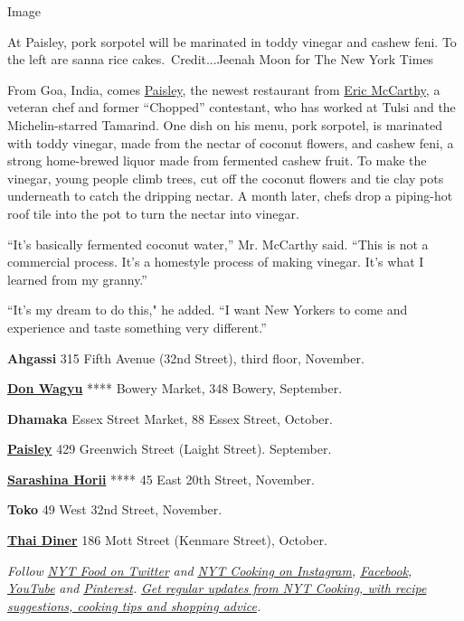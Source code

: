 Image

At Paisley, pork sorpotel will be marinated in toddy vinegar and cashew
feni. To the left are sanna rice cakes.~Credit...Jeenah Moon for The New
York Times

From Goa, India, comes
\href{http://www.paisleyrestaurantnyc.com/}{Paisley}, the newest
restaurant from
\href{https://www.nytimes3xbfgragh.onion/2002/07/31/dining/25-and-under-a-spicy-indian-spot-that-doesn-t-care-to-fit-in.html}{Eric
McCarthy}, a veteran chef and former ``Chopped'' contestant, who has
worked at Tulsi and the Michelin-starred Tamarind. One dish on his menu,
pork sorpotel, is marinated with toddy vinegar, made from the nectar of
coconut flowers, and cashew feni, a strong home-brewed liquor made from
fermented cashew fruit. To make the vinegar, young people climb trees,
cut off the coconut flowers and tie clay pots underneath to catch the
dripping nectar. A month later, chefs drop a piping-hot roof tile into
the pot to turn the nectar into vinegar.

``It's basically fermented coconut water,'' Mr. McCarthy said. ``This is
not a commercial process. It's a homestyle process of making vinegar.
It's what I learned from my granny.''

``It's my dream to do this," he added. ``I want New Yorkers to come and
experience and taste something very different.''

\textbf{Ahgassi} 315 Fifth Avenue (32nd Street), third floor, November.

\textbf{\href{http://donwagyu.net/}{Don Wagyu}} **** Bowery Market, 348
Bowery, September.

\textbf{Dhamaka} Essex Street Market, 88 Essex Street, October.

\textbf{\href{http://www.paisleyrestaurantnyc.com/}{Paisley}} 429
Greenwich Street (Laight Street). September.

\textbf{\href{https://www.sarashina-horii.com/en/}{Sarashina Horii}}
**** 45 East 20th Street, November.

\textbf{Toko} 49 West 32nd Street, November.

\textbf{\href{http://thaidiner.com/}{Thai Diner}} 186 Mott Street
(Kenmare Street), October.

\emph{Follow} \href{https://twitter.com/nytfood}{\emph{NYT Food on
Twitter}} \emph{and}
\href{https://www.instagram.com/nytcooking/}{\emph{NYT Cooking on
Instagram}}\emph{,}
\href{https://www.facebookcorewwwi.onion/nytcooking/}{\emph{Facebook}}\emph{,}
\href{https://www.youtube.com/nytcooking}{\emph{YouTube}} \emph{and}
\href{https://www.pinterest.com/nytcooking/}{\emph{Pinterest}}\emph{.}
\href{https://www.nytimes3xbfgragh.onion/newsletters/cooking}{\emph{Get
regular updates from NYT Cooking, with recipe suggestions, cooking tips
and shopping advice}}\emph{.}

